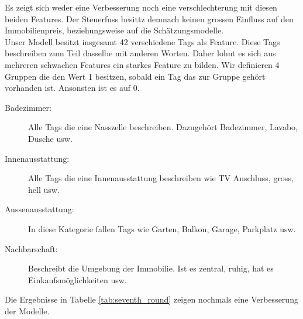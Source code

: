 \begin{table}[ht]
\centering
{}
\caption{Ergebnisse mit Einbezug des Steuerfuss}
\label{tab:sixth_round}
\end{table}
%
Es zeigt sich weder eine Verbesserung noch eine verschlechterung mit diesen beiden Features. Der Steuerfuss besittz demnach keinen grossen Einfluss auf den Immobilienpreis, beziehungsweise auf die Schätzungsmodelle.\\[2ex]
%
Unser Modell besitzt insgesamt 42 verschiedene Tags als Feature. Diese Tags beschreiben zum Teil dasselbe mit anderen Worten. Daher lohnt es sich aus mehreren schwachen Features ein starkes Feature zu bilden. Wir definieren 4 Gruppen die den Wert 1 besitzen, sobald ein Tag das zur Gruppe gehört vorhanden ist. Ansonsten ist es auf 0.
\begin{description}
\item[Badezimmer:] Alle Tags die eine Nasszelle beschreiben. Dazugehört Badezimmer, Lavabo, Dusche usw.
\item[Innenausstattung:] Alle Tags die eine Innenausstattung beschreiben wie TV Anschluss, gross, hell usw. 
\item[Aussenausstattung:] In diese Kategorie fallen Tags wie Garten, Balkon, Garage, Parkplatz usw.
\item[Nachbarschaft:] Beschreibt die Umgebung der Immobilie. Ist es zentral, ruhig, hat es Einkaufsmöglichkeiten usw.
\end{description}
%
Die Ergebnisse in Tabelle \ref{tab:seventh_round} zeigen nochmals eine Verbesserung der Modelle.\\ 
\begin{table}[ht]
\centering
{}
\caption{Ergebnisse mit gruppierten Tags}
\label{tab:seventh_round}
\end{table}
